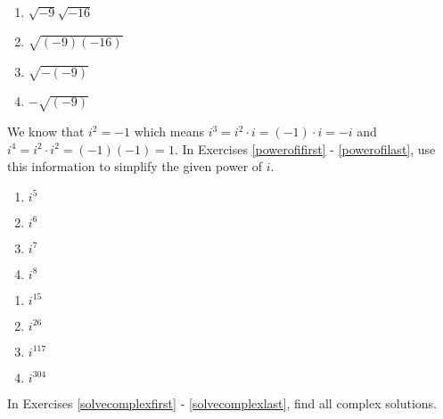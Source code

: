 \documentclass{ximera}
\begin{document}
\begin{multicols}{4}
\begin{enumerate}
\setcounter{enumi}{\value{HW}}

\item $\sqrt{-9}\sqrt{-16}$
\item $\sqrt{(-9)(-16)}$
\item $\sqrt{-(-9)}$
\item $-\sqrt{(-9)}$ \label{rootsofneglast}

\setcounter{HW}{\value{enumi}}
\end{enumerate}
\end{multicols}

We know that $i^{2} = -1$ which means $i^{3} = i^{2} \cdot i = (-1) \cdot i = -i$ and $i^{4} = i^{2} \cdot i^{2} = (-1)(-1) = 1$. In Exercises \ref{powerofifirst} - \ref{powerofilast}, use this information to simplify the given power of $i$.

\begin{multicols}{4}
\begin{enumerate}
\setcounter{enumi}{\value{HW}}

\item $i^{5}$ \label{powerofifirst}
\item $i ^{6}$
\item $i^{7}$
\item $i^{8}$

\setcounter{HW}{\value{enumi}}
\end{enumerate}
\end{multicols}

\begin{multicols}{4}
\begin{enumerate}
\setcounter{enumi}{\value{HW}}

\item $i^{15}$
\item $i^{26}$
\item $i^{117}$
\item $i^{304}$ \label{powerofilast}

\setcounter{HW}{\value{enumi}}
\end{enumerate}
\end{multicols}

In Exercises \ref{solvecomplexfirst} - \ref{solvecomplexlast}, find all complex solutions.
\end{document}
